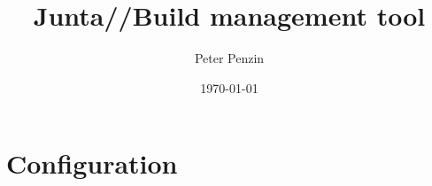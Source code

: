 \documentclass[11pt]{article}
\title{Junta//Build management tool}
\author{Peter Penzin}
\date{\today}
\begin{document}
\maketitle

\section{Configuration}
\end{document}
